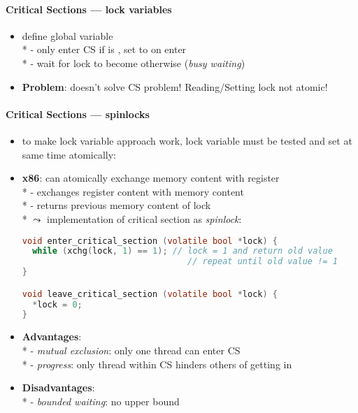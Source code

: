 \paragraph{Critical Sections --- lock variables}
\begin{itemize}
  \item define global  variable \\*
    - only enter CS if  is , set to  on enter \\*
    - wait for lock to become  otherwise (\emph{busy waiting})
  \item \textbf{Problem}: doesn't solve CS problem! Reading/Setting lock not atomic!
\end{itemize}

\paragraph{Critical Sections --- spinlocks}
\begin{itemize}
  \item to make lock variable approach work, lock variable must be tested and set at same time atomically:
  \item \textbf{x86}:  can atomically exchange memory content with register \\*
    - exchanges register content with memory content \\*
    - returns previous memory content of lock \\*
    \( \leadsto \) implementation of critical section as \emph{spinlock}:
  \begin{lstlisting}[language=c]
void enter_critical_section (volatile bool *lock) {
  while (xchg(lock, 1) == 1); // lock = 1 and return old value
                                 // repeat until old value != 1
}

void leave_critical_section (volatile bool *lock) {
  *lock = 0;
}
  \end{lstlisting}
  \item \textbf{Advantages}: \\*
    - \emph{mutual exclusion}: only one thread can enter CS \\*
    - \emph{progress}: only thread within CS hinders others of getting in
  \item \textbf{Disadvantages}: \\*
    - \emph{bounded waiting}: no upper bound
\end{itemize}

